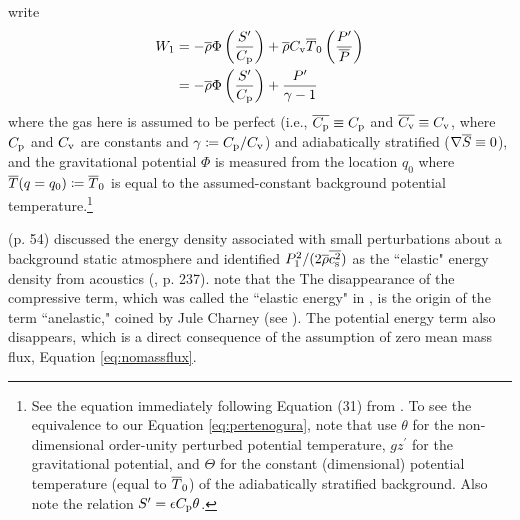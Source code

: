 \documentclass[12pt]{article}
\begin{document}
\citet{Ogura1962} write
\begin{align}\label{eq:pertenogura}
	W_1 &= -\overline{\rho}\Phi\left(\frac{S^\prime}{C_{\rm{p}}}\right)+\overline{\rho}C_{\rm{v}}\overline{T}_0\left(\frac{P^\prime}{\overline{P}}\right)\nonumber\\
	&=  -\overline{\rho}\Phi\left(\frac{S^\prime}{C_{\rm{p}}}\right)+\frac{P^\prime}{\gamma-1}
\end{align}
where the gas here is assumed to be perfect (i.e., $\overline{C_{\rm{p}}}\equiv C_{\rm{p}}$ and $\overline{C_{\rm{v}}}\equiv C_{\rm{v}}$, where $C_{\rm{p}}$ and $C_{\rm{v}}$ are constants and $\gamma\coloneqq C_{\rm{p}}/C_{\rm{v}}$) and adiabatically stratified ($\nabla\overline{S}\equiv0$), and the gravitational potential $\Phi$ is measured from the location $q_0$ where $\overline{T}(q=q_0)\coloneqq \overline{T}_0$  is equal to the assumed-constant background potential temperature.\footnote{See the equation immediately following Equation (31) from \citet{Ogura1962}. To see the equivalence to our Equation \eqref{eq:pertenogura}, note that \citet{Ogura1962} use $\theta$ for the non-dimensional order-unity perturbed potential temperature, $gz^\prime$ for the gravitational potential, and $\Theta$ for the constant (dimensional) potential temperature (equal to $\overline{T}_0$) of the adiabatically stratified background. Also note the relation $S^\prime=\epsilon C_{\rm{p}}\theta$.}

\citealt{Eckart1960} (p. 54) discussed the energy density associated with small perturbations about a background static atmosphere and identified $P_1^2/(2\overline{\rho}\overline{c_{\rm s}^2})$ as the ``elastic" energy density from acoustics (\citealt{Morse1948}, p. 237). \citealt{Ogura1962} note that the The disappearance of the compressive term, which was called the ``elastic energy" in \citet{Eckart1956}, is the origin of the term ``anelastic," coined by Jule Charney (see ). The potential energy term also disappears, which is a direct consequence of the assumption of zero mean mass flux, Equation \eqref{eq:nomassflux}. 
\end{document}
